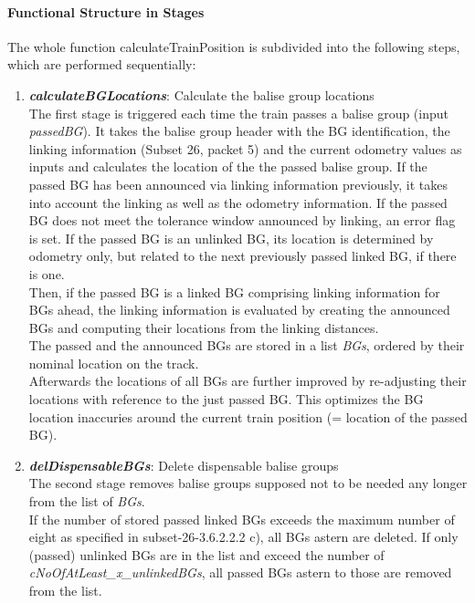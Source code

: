 \paragraph{Functional Structure in Stages}
The whole function calculateTrainPosition is subdivided into the following steps, which are performed sequentially: 
\begin{enumerate}
\item \textbf{\textit{calculateBGLocations}}: Calculate the balise group locations\\
The first stage is triggered each time the train passes a balise group (input \textit{passedBG}). It takes the balise group header with the BG identification, the linking information (Subset 26, packet 5) and the current odometry values as inputs and calculates the location of the the passed balise group. If the passed BG has been announced via linking information previously, it takes into account the linking as well as the odometry information. If the passed BG does not meet the tolerance window announced by linking, an error flag is set. If the passed BG is an unlinked BG, its location is determined by odometry only, but related to the next previously passed linked BG, if there is one.\\
Then, if the passed BG is a linked BG comprising linking information for BGs ahead, the linking information is evaluated by creating the announced BGs and computing their locations from the linking distances.\\
The passed and the announced BGs are stored in a list \textit{BGs}, ordered by their nominal location on the track.\\
Afterwards the locations of all BGs are further improved by re-adjusting their locations with reference to the just passed BG. This optimizes the BG location inaccuries around the current train position (= location of the passed BG). 

\item \textbf{\textit{delDispensableBGs}}: Delete dispensable balise groups\\
The second stage removes balise groups supposed not to be needed any longer from the list of \textit{BGs}.\\
If the number of stored passed linked BGs exceeds the maximum number of eight as specified in subset-26-3.6.2.2.2 c), all BGs astern are deleted.
If only (passed) unlinked BGs are in the list and exceed the number of \textit{cNoOfAtLeast\_x\_unlinkedBGs}, all passed BGs astern to those are removed from the list. 


\end{enumerate}
